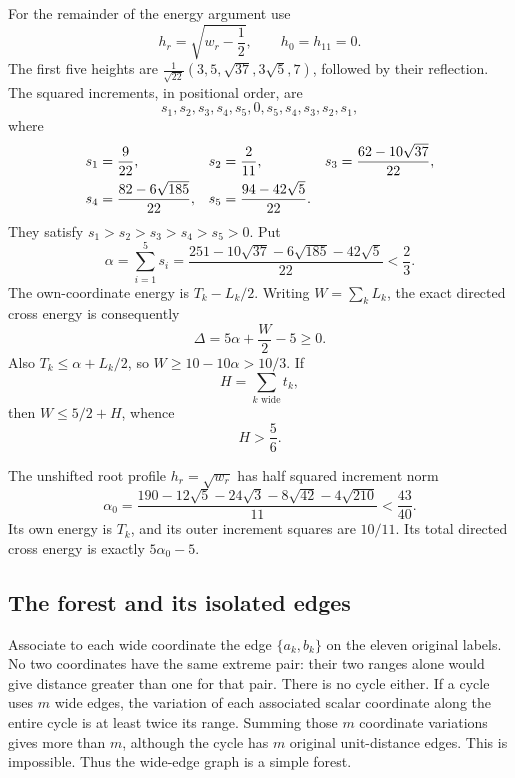 \documentclass[11pt]{article}
\theoremstyle{definition}
\theoremstyle{remark}
\begin{document}
For the remainder of the energy argument use
\[
 h_r=\sqrt{w_r-\frac12},\qquad h_0=h_{11}=0.
\]
The first five heights are
$\frac1{\sqrt{22}}(3,5,\sqrt{37},3\sqrt5,7)$, followed by their
reflection. The squared increments, in positional order, are
\begin{equation}\label{eq:squares}
 s_1,s_2,s_3,s_4,s_5,0,s_5,s_4,s_3,s_2,s_1,
\end{equation}
where
\begin{align}\label{eq:sdefinitions}
 s_1&=\frac9{22},&s_2&=\frac2{11},&
 s_3&=\frac{62-10\sqrt{37}}{22},\notag\\
 s_4&=\frac{82-6\sqrt{185}}{22},&
 s_5&=\frac{94-42\sqrt5}{22}.
\end{align}
They satisfy $s_1>s_2>s_3>s_4>s_5>0$. Put
\begin{equation}\label{eq:alpha}
 \alpha=\sum_{i=1}^5s_i
   =\frac{251-10\sqrt{37}-6\sqrt{185}-42\sqrt5}{22}<\frac23.
\end{equation}
The own-coordinate energy is $T_k-L_k/2$. Writing
$W=\sum_kL_k$, the exact directed cross energy is consequently
\begin{equation}\label{eq:delta}
 \Delta=5\alpha+\frac W2-5\geq0.
\end{equation}
Also $T_k\leq\alpha+L_k/2$, so $W\geq10-10\alpha>10/3$.
If
\[
 H=\sum_{k\text{ wide}}t_k,
\]
then $W\leq5/2+H$, whence
\begin{equation}\label{eq:Hlower}
 H>\frac56.
\end{equation}

The unshifted root profile $h_r=\sqrt{w_r}$ has half squared increment
norm
\begin{equation}\label{eq:alpha0}
 \alpha_0=
 \frac{190-12\sqrt5-24\sqrt3-8\sqrt{42}-4\sqrt{210}}{11}
 <\frac{43}{40}.
\end{equation}
Its own energy is $T_k$, and its outer increment squares are $10/11$.
Its total directed cross energy is exactly $5\alpha_0-5$.

\subsection{The forest and its isolated edges}

Associate to each wide coordinate the edge $\{a_k,b_k\}$ on the eleven
original labels. No two coordinates have the same extreme pair: their
two ranges alone would give distance greater than one for that pair.
There is no cycle either. If a cycle uses $m$ wide edges, the variation
of each associated scalar coordinate along the entire cycle is at least
twice its range. Summing those $m$ coordinate variations gives more than
$m$, although the cycle has $m$ original unit-distance edges. This is
impossible. Thus the wide-edge graph is a simple forest.
\end{document}
